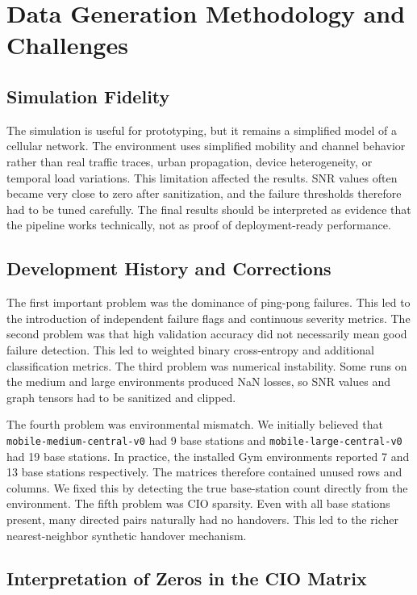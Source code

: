 \documentclass[11pt, a4paper, twoside]{article}
\begin{document}
\section{Data Generation Methodology and Challenges}
\label{sec:data_generation}

\subsection{Simulation Fidelity}

The simulation is useful for prototyping, but it remains a simplified model of a cellular network. The environment uses simplified mobility and channel behavior rather than real traffic traces, urban propagation, device heterogeneity, or temporal load variations. This limitation affected the results. SNR values often became very close to zero after sanitization, and the failure thresholds therefore had to be tuned carefully. The final results should be interpreted as evidence that the pipeline works technically, not as proof of deployment-ready performance.

\subsection{Development History and Corrections}

The first important problem was the dominance of ping-pong failures. This led to the introduction of independent failure flags and continuous severity metrics. The second problem was that high validation accuracy did not necessarily mean good failure detection. This led to weighted binary cross-entropy and additional classification metrics. The third problem was numerical instability. Some runs on the medium and large environments produced NaN losses, so SNR values and graph tensors had to be sanitized and clipped.

The fourth problem was environmental mismatch. We initially believed that \texttt{mobile-medium-central-v0} had 9 base stations and \texttt{mobile-large-central-v0} had 19 base stations. In practice, the installed Gym environments reported 7 and 13 base stations respectively. The matrices therefore contained unused rows and columns. We fixed this by detecting the true base-station count directly from the environment. The fifth problem was CIO sparsity. Even with all base stations present, many directed pairs naturally had no handovers. This led to the richer nearest-neighbor synthetic handover mechanism.

\subsection{Interpretation of Zeros in the CIO Matrix}
\end{document}
